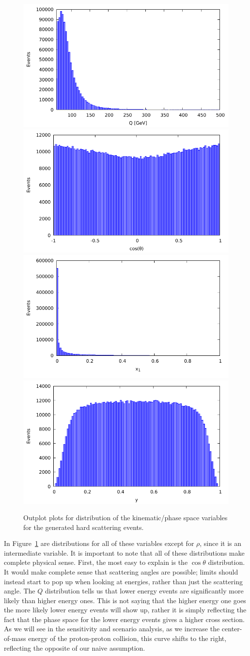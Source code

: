 \begin{figure}[ht]
  \centering
  \includegraphics[width=0.4\linewidth]{./res/gfx/results/Q.pdf}
  \includegraphics[width=0.4\linewidth]{./res/gfx/results/cos_theta.pdf}
  \includegraphics[width=0.4\linewidth]{./res/gfx/results/x1.pdf}
  \includegraphics[width=0.4\linewidth]{./res/gfx/results/y.pdf}
  \caption{Outplot plots for distribution of the kinematic/phase space variables for the generated hard scattering events.}
  \label{fig:hard-scattering-dist}
\end{figure}

In Figure~\ref{fig:hard-scattering-dist} are distributions for all of these variables except for $\rho$, since it is an intermediate variable. It is important to note that all of these distributions make complete physical sense. First, the most easy to explain is the $\cos\theta$ distribution. It would make complete sense that scattering angles are possible; limits should instead start to pop up when looking at energies, rather than just the scattering angle. The $Q$ distribution tells us that lower energy events are significantly more likely than higher energy ones. This is not saying that the higher energy one goes the more likely lower energy events will show up, rather it is simply reflecting the fact that the phase space for the lower energy events gives a higher cross section. As we will see in the sensitivity and scenario analysis, as we increase the center-of-mass energy of the proton-proton collision,  this curve shifts to the right, reflecting the opposite of our naive assumption.

